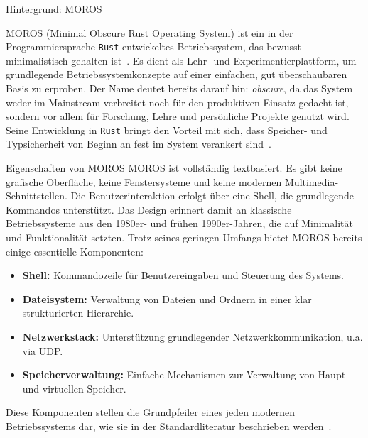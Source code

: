 \begin{section}{Hintergrund: MOROS}

MOROS (Minimal Obscure Rust Operating System) ist ein in der Programmiersprache \texttt{Rust} entwickeltes Betriebssystem, das bewusst minimalistisch gehalten ist~\cite{moros_github}.
Es dient als Lehr- und Experimentierplattform, um grundlegende Betriebssystemkonzepte auf einer einfachen, gut überschaubaren Basis zu erproben.
Der Name deutet bereits darauf hin: \emph{obscure}, da das System weder im Mainstream verbreitet noch für den produktiven Einsatz gedacht ist,
sondern vor allem für Forschung, Lehre und persönliche Projekte genutzt wird.
Seine Entwicklung in \texttt{Rust} bringt den Vorteil mit sich, dass Speicher- und Typsicherheit von Beginn an fest im System verankert sind~\cite{klabnik2025rust}.
\begin{subsection}{Eigenschaften von MOROS}
MOROS ist vollständig textbasiert.
Es gibt keine grafische Oberfläche, keine Fenstersysteme und keine modernen Multimedia-Schnittstellen.
Die Benutzerinteraktion erfolgt über eine Shell, die grundlegende Kommandos unterstützt.
Das Design erinnert damit an klassische Betriebssysteme aus den 1980er- und frühen 1990er-Jahren, die auf Minimalität und Funktionalität setzten.
Trotz seines geringen Umfangs bietet MOROS bereits einige essentielle Komponenten:
\begin{itemize}
    \item \textbf{Shell:} Kommandozeile für Benutzereingaben und Steuerung des Systems.
    \item \textbf{Dateisystem:} Verwaltung von Dateien und Ordnern in einer klar strukturierten Hierarchie.
    \item \textbf{Netzwerkstack:} Unterstützung grundlegender Netzwerkkommunikation, u.a. via UDP.
    \item \textbf{Speicherverwaltung:} Einfache Mechanismen zur Verwaltung von Haupt- und virtuellen Speicher.
\end{itemize}
Diese Komponenten stellen die Grundpfeiler eines jeden modernen Betriebssystems dar, wie sie in der Standardliteratur beschrieben werden~\cite{tanenbaum2015modern}.
\end{subsection}


\end{section}
